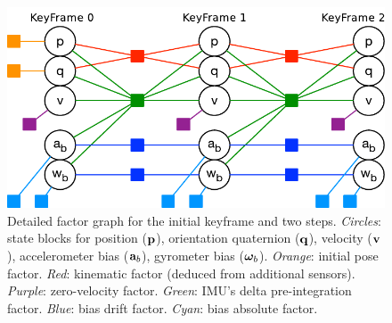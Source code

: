 


\begin{figure}[tb]
\centering
\includegraphics[scale=0.65]{figures/graph_exploded}
\caption{
Detailed factor graph for the initial keyframe and two steps. 
\emph{Circles}: state blocks for position (${\bf p}$), orientation quaternion (${\bf q}$), velocity (${\bf v}$), accelerometer bias (${\bf a}_b$), gyrometer bias (${{\bm \omega}}_b$). 
\emph{Orange}: initial pose factor. 
\emph{Red}: kinematic factor (deduced from additional sensors). 
\emph{Purple}: zero-velocity factor. 
\emph{Green}: IMU's delta pre-integration factor. 
\emph{Blue}: bias drift factor. 
\emph{Cyan}: bias absolute factor. 
}
\label{fig:factor_graph}
\end{figure}



